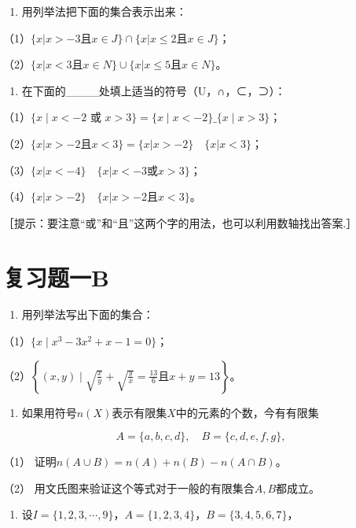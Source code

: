 \begin{enumerate}[start=5]
\item
  用列举法把下面的集合表示出来：
\end{enumerate}

（1）\(\{x|x > -3\)且\(x\in J\} \cap \{x|x\leqslant 2\)且\(x\in J\}\)；

（2）\(\{x|x < 3\)且\(x\in N\} \cup \{x|x\leqslant 5\)且\(x\in N\}\)。

\begin{enumerate}[start=6]
\item
  在下面的\_\_\_\_处填上适当的符号（U，∩，⊂，⊃）：
\end{enumerate}

（1）\(\{x \mid x < -2 \text{ 或 } x > 3\} = \{x \mid x < -2\} \_ \{x \mid x > 3\}\)；

（2）\(\{x|x > -2\)且\(x < 3\} = \{x|x > -2\} \quad \{x|x < 3\}\)；

（3）\(\{x|x < -4\} \quad \{x|x < -3\)或\(x > 3\}\)；

（4）\(\{x|x > -2\} \quad \{x|x > -2\)且\(x < 3\}\)。

［提示：要注意``或''和``且''这两个字的用法，也可以利用数轴找出答案.］

\section{复习题一B}

\begin{enumerate}
\item
  用列举法写出下面的集合：
\end{enumerate}

（1）\(\{x\mid x^{3} - 3x^{2} + x - 1 = 0\}\)；

（2）\(\left\{(x, y) \mid \sqrt{\frac{x}{y}} + \sqrt{\frac{y}{x}} = \frac{13}{6} \text{且} x + y = 13\right\}\)。

\begin{enumerate}[start=2]
\item
  如果用符号\(n(X)\)表示有限集\(X\)中的元素的个数，今有有限集
\end{enumerate}

\[
A = \{a, b, c, d \}, \quad B = \{c, d, e, f, g \},
\]

（1） 证明\(n(A \cup B) = n(A) + n(B) - n(A \cap B)\)。

（2） 用文氏图来验证这个等式对于一般的有限集合\(A, B\)都成立。

\begin{enumerate}[start=3]
\item
  设\(I = \{1, 2, 3, \cdots, 9\}\)，\(A = \{1, 2, 3, 4\}\)，\(B = \{3, 4, 5, 6, 7\}\)，
\end{enumerate}

